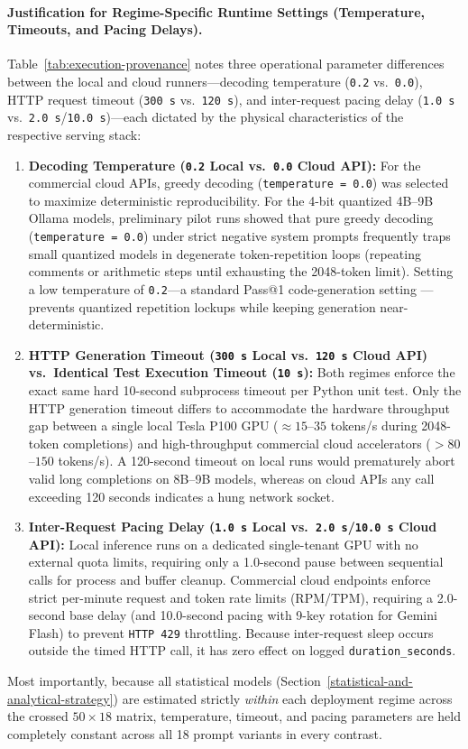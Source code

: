 \documentclass[a4paper,fleqn]{cas-sc}
\providecommand{\tightlist}{%
  \setlength{\itemsep}{0pt}\setlength{\parskip}{0pt}}
\begin{document}
\paragraph{Justification for Regime-Specific Runtime Settings (Temperature, Timeouts, and Pacing Delays).}
Table~\ref{tab:execution-provenance} notes three operational parameter differences between the local and cloud runners—decoding temperature (\texttt{0.2} vs.\ \texttt{0.0}), HTTP request timeout (\texttt{300\,s} vs.\ \texttt{120\,s}), and inter-request pacing delay (\texttt{1.0\,s} vs.\ \texttt{2.0\,s}/\texttt{10.0\,s})—each dictated by the physical characteristics of the respective serving stack:
\begin{enumerate}
\tightlist
\item \textbf{Decoding Temperature (\texttt{0.2} Local vs.\ \texttt{0.0} Cloud API):} For the commercial cloud APIs, greedy decoding (\texttt{temperature = 0.0}) was selected to maximize deterministic reproducibility. For the 4-bit quantized 4B--9B Ollama models, preliminary pilot runs showed that pure greedy decoding (\texttt{temperature = 0.0}) under strict negative system prompts frequently traps small quantized models in degenerate token-repetition loops (repeating comments or arithmetic steps until exhausting the 2048-token limit). Setting a low temperature of \texttt{0.2}—a standard Pass@1 code-generation setting \citep{chen2021codex}—prevents quantized repetition lockups while keeping generation near-deterministic.
\item \textbf{HTTP Generation Timeout (\texttt{300\,s} Local vs.\ \texttt{120\,s} Cloud API) vs.\ Identical Test Execution Timeout (\texttt{10\,s}):} Both regimes enforce the exact same hard 10-second subprocess timeout per Python unit test. Only the HTTP generation timeout differs to accommodate the hardware throughput gap between a single local Tesla P100 GPU ($\approx 15$--$35$ tokens/s during 2048-token completions) and high-throughput commercial cloud accelerators ($>80$--$150$ tokens/s). A 120-second timeout on local runs would prematurely abort valid long completions on 8B--9B models, whereas on cloud APIs any call exceeding 120 seconds indicates a hung network socket.
\item \textbf{Inter-Request Pacing Delay (\texttt{1.0\,s} Local vs.\ \texttt{2.0\,s}/\texttt{10.0\,s} Cloud API):} Local inference runs on a dedicated single-tenant GPU with no external quota limits, requiring only a 1.0-second pause between sequential calls for process and buffer cleanup. Commercial cloud endpoints enforce strict per-minute request and token rate limits (RPM/TPM), requiring a 2.0-second base delay (and 10.0-second pacing with 9-key rotation for Gemini Flash) to prevent \texttt{HTTP 429} throttling. Because inter-request sleep occurs outside the timed HTTP call, it has zero effect on logged \texttt{duration\_seconds}.
\end{enumerate}
Most importantly, because all statistical models (Section~\ref{statistical-and-analytical-strategy}) are estimated strictly \emph{within} each deployment regime across the crossed $50 \times 18$ matrix, temperature, timeout, and pacing parameters are held completely constant across all 18 prompt variants in every contrast.
\end{document}
